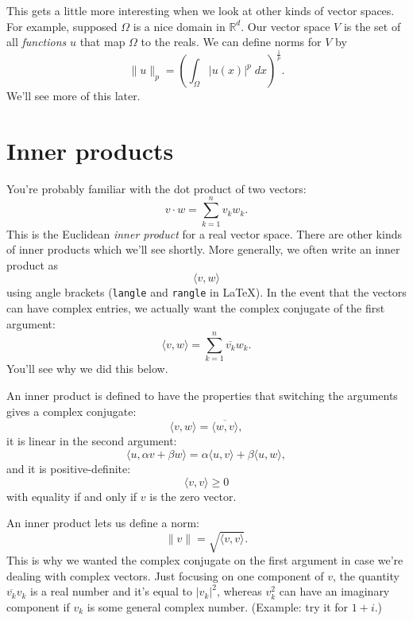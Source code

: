 \documentclass{article}
\theoremstyle{definition}
\theoremstyle{plain}
\begin{document}
This gets a little more interesting when we look at other kinds of vector spaces.
For example, supposed $\Omega$ is a nice domain in $\mathbb{R}^d$.
Our vector space $V$ is the set of all \emph{functions} $u$ that map $\Omega$ to the reals.
We can define norms for $V$ by
\begin{equation}
    \|u\|_p = \left(\int_\Omega|u(x)|^p\; dx\right)^{\frac{1}{p}}.
\end{equation}
We'll see more of this later.


\section{Inner products}

You're probably familiar with the dot product of two vectors:
\begin{equation}
    v\cdot w = \sum_{k = 1}^nv_kw_k.
\end{equation}
This is the Euclidean \emph{inner product} for a real vector space.
There are other kinds of inner products which we'll see shortly.
More generally, we often write an inner product as
\begin{equation}
    \langle v, w\rangle
\end{equation}
using angle brackets (\texttt{langle} and \texttt{rangle} in LaTeX).
In the event that the vectors can have complex entries, we actually want the complex conjugate of the first argument:
\begin{equation}
    \langle v, w\rangle = \sum_{k = 1}^n\overline{v_k}w_k.
\end{equation}
You'll see why we did this below.

An inner product is defined to have the properties that switching the arguments gives a complex conjugate:
\begin{equation}
    \langle v, w\rangle = \overline{\langle w, v\rangle},
\end{equation}
it is linear in the second argument:
\begin{equation}
    \langle u, \alpha v + \beta w\rangle = \alpha\langle u, v\rangle + \beta\langle u, w\rangle,
\end{equation}
and it is positive-definite:
\begin{equation}
    \langle v, v\rangle \ge 0
\end{equation}
with equality if and only if $v$ is the zero vector.

An inner product lets us define a norm:
\begin{equation}
    \|v\| = \sqrt{\langle v, v\rangle}.
\end{equation}
This is why we wanted the complex conjugate on the first argument in case we're dealing with complex vectors.
Just focusing on one component of $v$, the quantity $\overline{v_k}v_k$ is a real number and it's equal to $|v_k|^2$, whereas $v_k^2$ can have an imaginary component if $v_k$ is some general complex number.
(Example: try it for $1 + i$.)
\end{document}
